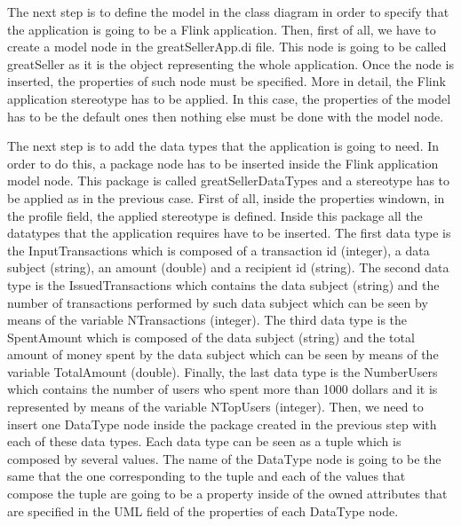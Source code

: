 The next step is to define the model in the class diagram in order to specify that the application is going to be a Flink application. Then, first of all, we have to create a model node in the greatSellerApp.di file. This node is going to be called greatSeller as it is the object representing the whole application. Once the node is inserted, the properties of such node must be specified. More in detail, the Flink application stereotype has to be applied. In this case, the properties of the model has to be the default ones then nothing else must be done with the model node.

The next step is to add the data types that the application is going to need. In order to do this, a package node has to be inserted inside the Flink application model node. This package is called greatSellerDataTypes and a stereotype has to be applied as in the previous case. First of all, inside the properties windown, in the profile field, the applied stereotype is defined. Inside this package all the datatypes that the application requires have to be inserted. The first data type is the InputTransactions which is composed of a transaction id (integer), a data subject (string), an amount (double) and a recipient id (string). The second data type is the IssuedTransactions which contains the data subject (string) and the number of transactions performed by such data subject which can be seen by means of the variable NTransactions (integer). The third data type is the SpentAmount which is composed of the data subject (string) and the total amount of money spent by the data subject which can be seen by means of the variable TotalAmount (double). Finally, the last data type is the NumberUsers which contains the number of users who spent more than 1000 dollars and it is represented by means of the variable NTopUsers (integer). Then, we need to insert one DataType node inside the package created in the previous step with each of these data types. Each data type can be seen as a tuple which is composed by several values. The name of the DataType node is going to be the same that the one corresponding to the tuple and each of the values that compose the tuple are going to be a property inside of the owned attributes that are specified in the UML field of the properties of each DataType node.

